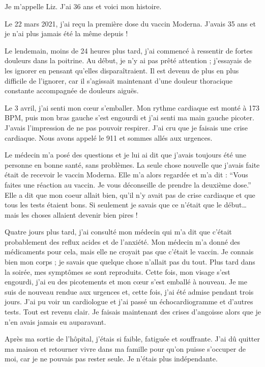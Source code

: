 Je m'appelle Liz. J'ai 36 ans et voici mon histoire.

Le 22 mars 2021, j'ai reçu la première dose du vaccin Moderna. J'avais 35 ans et
je n'ai plus jamais été la même depuis !

Le lendemain, moins de 24 heures plus tard, j'ai commencé à ressentir de fortes
douleurs dans la poitrine. Au début, je n'y ai pas prêté attention ; j'essayais
de les ignorer en pensant qu'elles disparaîtraient. Il est devenu de plus en
plus difficile de l'ignorer, car il s'agissait maintenant d'une douleur
thoracique constante accompagnée de douleurs aiguës.

Le 3 avril, j'ai senti mon cœur s'emballer. Mon rythme cardiaque est monté à 173
BPM, puis mon bras gauche s'est engourdi et j'ai senti ma main gauche
picoter. J'avais l'impression de ne pas pouvoir respirer. J'ai cru que je
faisais une crise cardiaque. Nous avons appelé le 911 et sommes allés aux
urgences.

Le médecin m'a posé des questions et je lui ai dit que j'avais toujours été une
personne en bonne santé, sans problèmes. La seule chose nouvelle que j'avais
faite était de recevoir le vaccin Moderna. Elle m'a alors regardée et m'a dit :
“Vous faites une réaction au vaccin. Je vous déconseille de prendre la deuxième
dose.” Elle a dit que mon coeur allait bien, qu'il n'y avait pas de crise
cardiaque et que tous les tests étaient bons. Si seulement je savais que ce
n'était que le début… mais les choses allaient devenir bien pires !

Quatre jours plus tard, j'ai consulté mon médecin qui m'a dit que c'était
probablement des reflux acides et de l'anxiété. Mon médecin m'a donné des
médicaments pour cela, mais elle ne croyait pas que c'était le vaccin. Je
connais bien mon corps ; je savais que quelque chose n'allait pas du tout. Plus
tard dans la soirée, mes symptômes se sont reproduits. Cette fois, mon visage
s'est engourdi, j'ai eu des picotements et mon cœur s'est emballé à nouveau. Je
me suis de nouveau rendue aux urgences et, cette fois, j'ai été admise pendant
trois jours. J'ai pu voir un cardiologue et j'ai passé un échocardiogramme et
d'autres tests. Tout est revenu clair. Je faisais maintenant des crises
d'angoisse alors que je n'en avais jamais eu auparavant.

Après ma sortie de l'hôpital, j'étais si faible, fatiguée et souffrante. J'ai dû
quitter ma maison et retourner vivre dans ma famille pour qu'on puisse s'occuper
de moi, car je ne pouvais pas rester seule. Je n'étais plus indépendante.

